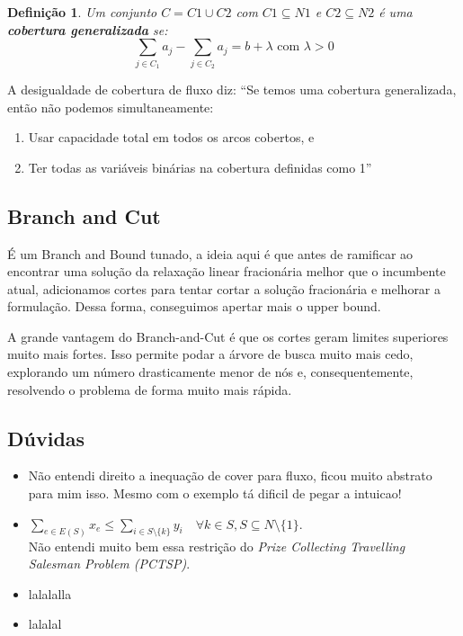\documentclass[12pt,a4paper]{article}
\newtheorem{definition}{Definição}[section]
\begin{document}
\begin{definition}
Um conjunto $C= C1 \cup C2$ com $C1 \subseteq N1$ e $C2 \subseteq N2$ é uma \textbf{cobertura generalizada} se:
\[
\sum_{j \in C_1} a_j - \sum_{j \in C_2} a_j = b + \lambda \text{ com } \lambda > 0
\]

\end{definition}

A desigualdade de cobertura de fluxo diz: ``Se temos uma cobertura generalizada, então não podemos simultaneamente:
\begin{enumerate}
\item Usar capacidade total em todos os arcos cobertos, e
\item Ter todas as variáveis binárias na cobertura definidas como 1''
\end{enumerate}

\subsection{Branch and Cut}

É um Branch and Bound tunado, a ideia aqui é que antes de ramificar ao encontrar uma solução da relaxação linear fracionária melhor que o incumbente atual, adicionamos cortes para tentar cortar a solução fracionária e melhorar a formulação. Dessa forma, conseguimos apertar mais o upper bound.

A grande vantagem do Branch-and-Cut é que os cortes geram limites superiores muito mais fortes. Isso permite podar a árvore de busca muito mais cedo, explorando um número drasticamente menor de nós e, consequentemente, resolvendo o problema de forma muito mais rápida.

\subsection{Dúvidas}

\begin{itemize}
    \item Não entendi direito a inequação de cover para fluxo, ficou muito abstrato para mim isso. Mesmo com o exemplo tá dificil de pegar a intuicao!
    \item 
    $\sum _{e \in E(S)} x_e \leq \sum _{i \in S \setminus \{k\}} y_i \quad \forall k \in S, S \subseteq N \setminus \{1\}$. \\
    Não entendi muito bem essa restrição do \emph{Prize Collecting Travelling Salesman Problem
(PCTSP)}.
    \item lalalalla
    \item lalalal
\end{itemize}


\begingroup
\onehalfspacing
\printbibliography
\endgroup
\end{document}
